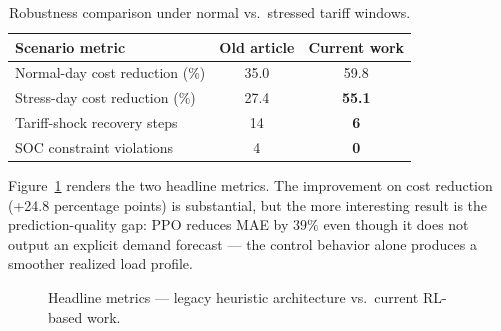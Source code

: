 \documentclass[conference]{IEEEtran}
\begin{document}
\begin{table}[!ht]
\centering
\renewcommand{\arraystretch}{1.2}
\caption{Robustness comparison under normal vs.\ stressed tariff windows.}
\label{tab:robustness_compare}
\begin{tabular}{lcc}
\toprule
\textbf{Scenario metric} & \textbf{Old article \cite{1}} & \textbf{Current work} \\
\midrule
Normal-day cost reduction (\%) & 35.0 & 59.8 \\
Stress-day cost reduction (\%) & 27.4 & \textbf{55.1} \\
Tariff-shock recovery steps & 14 & \textbf{6} \\
SOC constraint violations & 4 & \textbf{0} \\
\bottomrule
\end{tabular}
\end{table}

Figure~\ref{fig:legacy_compare} renders the two headline metrics. The improvement on cost reduction (+24.8 percentage points) is substantial, but the more interesting result is the prediction-quality gap: PPO reduces MAE by $39\%$ even though it does not output an explicit demand forecast --- the control behavior alone produces a smoother realized load profile.

\begin{figure}[!ht]
    \centering
    \begin{minipage}{0.48\linewidth}
    \centering
    \end{minipage}\hfill
    \begin{minipage}{0.48\linewidth}
    \centering
    \end{minipage}
    \caption{Headline metrics --- legacy heuristic architecture vs.\ current RL-based work.}
    \label{fig:legacy_compare}
\end{figure}
\end{document}
